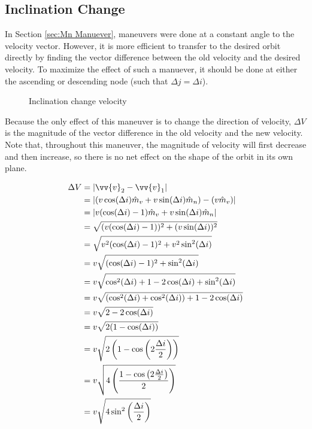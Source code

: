 \documentclass[../basicOrbitalDynamics.tex]{subfiles}
\begin{document}
\bigskip\bigskip
\subsection{Inclination Change}

In Section  \ref{sec:Mn Manuever}, maneuvers were done at a constant angle to the velocity vector. However, it is more efficient to transfer to the desired orbit directly by finding the vector difference between the old velocity and the desired velocity. To maximize the effect of such a manuever, it should be done at either the ascending or descending node (such that $\Delta j=\Delta i$).

\begin{figure}[H]
    \centering
    \caption{Inclination change velocity}\label{fig:dV Triangle Inclination Chage}
\end{figure}

Because the only effect of this maneuver is to change the direction of velocity, $\Delta V$ is the magnitude of the vector difference in the old velocity and the new velocity. Note that, throughout this maneuver, the magnitude of velocity will first decrease and then increase, so there is no net effect on the shape of the orbit in its own plane.

\begin{align*}
    \Delta V &= |\vv{v}_2-\vv{v}_1| \\
    &= |(v\cos(\Delta i)\hat{m}_v+v\sin(\Delta i)\hat{m}_n)-(v\hat{m}_v)| \\
    &= |v(\cos(\Delta i)-1)\hat{m}_v+v\sin(\Delta i)\hat{m}_n| \\
    &= \sqrt{(v(\cos(\Delta i)-1))^2+(v\sin(\Delta i))^2} \\
    &= \sqrt{v^2(\cos(\Delta i)-1)^2+v^2\sin^2(\Delta i)} \\
    &= v\sqrt{(\cos(\Delta i)-1)^2+\sin^2(\Delta i)} \\
    &= v\sqrt{\cos^2(\Delta i)+1-2\cos(\Delta i)+\sin^2(\Delta i)} \\
    &= v\sqrt{(\cos^2(\Delta i)+\cos^2(\Delta i))+1-2\cos(\Delta i)} \\
    &= v\sqrt{2-2\cos(\Delta i)} \\
    &= v\sqrt{2(1-\cos(\Delta i))} \\
    &= v\sqrt{2\left(1-\cos\left(2\frac{\Delta i}{2}\right)\right)} \\
    &= v\sqrt{4\left(\frac{1-\cos\left(2\frac{\Delta i}{2}\right)}{2}\right)} \\
    &= v\sqrt{4\sin^2\left(\frac{\Delta i}{2}\right)} \\
\end{align*}
\end{document}

